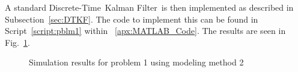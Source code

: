 \documentclass[]{article}
\renewcommand{\lstlistingname}{Script}
\newcommand{\scriptname}{\lstlistingname}
\newcommand{\KF}{Kalman Filter}
\newcommand{\DT}{Discrete-Time}
\newcommand{\DTKF}{\DT \ \KF}
\newcommand{\subsectionname}{Subsection}
\renewcommand{\figurename}{Fig.}
\begin{document}
		A standard \DTKF \ is then implemented as described in \subsectionname \ \ref{sec:DTKF}. The code to implement this can be found in \scriptname \ \ref{script:pblm1} within \appendixname \ \ref{apx:MATLAB_Code}. The results are seen in \figurename \ \ref{fig:pblm1resultsmethod2}.
		
		\begin{figure}[h]
			\centering
			\caption{Simulation results for problem 1 using modeling method 2}
			\label{fig:pblm1resultsmethod2}
		\end{figure}
	
	
	\newpage
\end{document}

